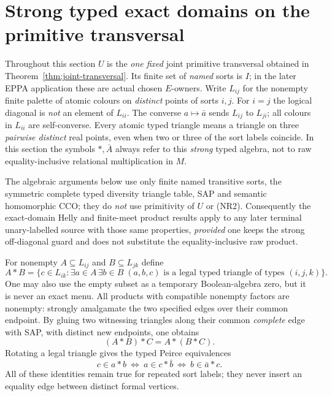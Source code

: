 \section{Strong typed exact domains on the primitive transversal}
\label{sec:typed-strong}

Throughout this section $U$ is the \emph{one fixed} joint primitive
transversal obtained in Theorem~\ref{thm:joint-transversal}.  Its
finite set of \emph{named} sorts is $I$; in the later EPPA application
these are actual chosen $E$-owners.  Write $L_{ij}$ for the nonempty
finite palette of atomic colours on \emph{distinct} points of sorts
$i,j$.  For $i=j$ the logical diagonal is \emph{not} an element of
$L_{ii}$.  The converse $a\mapsto\bar a$ sends $L_{ij}$ to $L_{ji}$;
all colours in $L_{ii}$ are self-converse.  Every atomic typed triangle
means a triangle on three \emph{pairwise distinct} real points, even
when two or three of the sort labels coincide.  In this section the
symbols $*,\bar A$ always refer to this \emph{strong} typed algebra,
not to raw equality-inclusive relational multiplication in $M$.

The algebraic arguments below use only finite named transitive
sorts, the symmetric complete typed diversity triangle table,
SAP and semantic homomorphic CCO; they do \emph{not} use
primitivity of $U$ or (NR2). Consequently the exact-domain
Helly and finite-meet product results apply to any later
terminal unary-labelled source with those same properties,
\emph{provided} one keeps the strong off-diagonal guard
and does not substitute the equality-inclusive raw product.

For nonempty $A\subseteq L_{ij}$ and $B\subseteq L_{jk}$ define
\[
 A*B=\{c\in L_{ik}:\exists a\in A\,\exists b\in B\;
      (a,b,c)\text{ is a legal typed triangle of types }(i,j,k)\}.
\]
One may also use the empty subset as a temporary Boolean-algebra
zero, but it is never an exact menu.  All products with compatible
nonempty factors are nonempty: strongly amalgamate the two specified
edges over their common endpoint.  By gluing two witnessing triangles
along their common \emph{complete} edge with SAP, with distinct new
endpoints, one obtains
\begin{equation}\label{eq:strong-assoc}
 (A*B)*C=A*(B*C).
\end{equation}
Rotating a legal triangle gives the typed Peirce equivalences
\begin{equation}\label{eq:typed-peirce}
 c\in a*b\ \Longleftrightarrow\ a\in c*\bar b
 \ \Longleftrightarrow\ b\in\bar a*c.
\end{equation}
All of these identities remain true for repeated sort labels; they
never insert an equality edge between distinct formal vertices.

